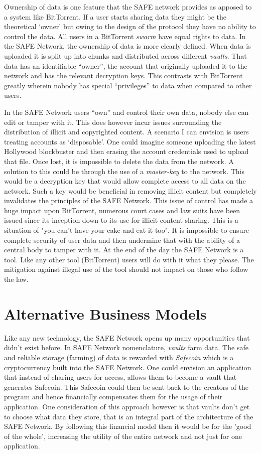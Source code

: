 Ownership of data is one feature that the SAFE network provides as apposed to a system like BitTorrent. If a user starts sharing data they might be the theoretical `owner' but owing to the design of the protocol they have no ability to control the data. All users in a BitTorrent \textit{swarm} have equal rights to data. In the SAFE Network, the ownership of data is more clearly defined. When data is uploaded it is split up into chunks and distributed across different \textit{vaults}. That data has an identifiable ``owner'', the account that originally uploaded it to the network and has the relevant decryption keys. This contrasts with BitTorrent greatly wherein nobody has special ``privileges'' to data when compared to other users.

In the SAFE Network users ``own'' and control their own data, nobody else can edit or tamper with it. This does however incur issues surrounding the distribution of illicit and copyrighted content. A scenario I can envision is users treating accounts as `disposable'. One could imagine someone uploading the latest Hollywood blockbuster and then erasing the account credentials used to upload that file. Once lost, it is impossible to delete the data from the network. A solution to this could be through the use of a \textit{master-key} to the network. This would be a decryption key that would allow complete access to all data on the network. Such a key would be beneficial in removing illicit content but completely invalidates the principles of the SAFE Network. This issue of control has made a huge impact upon BitTorrent, numerous court cases and law suits have been issued since its inception down to its use for illicit content sharing. This is a situation of "you can't have your cake and eat it too". It is impossible to ensure complete security of user data and then undermine that with the ability of a central body to tamper with it. At the end of the day the SAFE Network is a tool. Like any other tool (BitTorrent) users will do with it what they please. The mitigation against illegal use of the tool should not impact on those who follow the law.

\section{Alternative Business Models}

Like any new technology, the SAFE Network opens up many opportunities that didn't exist before. In SAFE Network nomenclature, \textit{vaults} farm data. The safe and reliable storage (farming) of data is rewarded with \textit{Safecoin} which is a cryptocurrency built into the SAFE Network. One could envision an application that instead of charing users for access, allows them to become a vault that generates Safecoin. This Safecoin could then be sent back to the creators of the program and hence financially compensates them for the usage of their application. One consideration of this approach however is that vaults don't get to choose what data they store, that is an integral part of the architecture of the SAFE Network. By following this financial model then it would be for the 'good of the whole', increasing the utility of the entire network and not just for one application.

